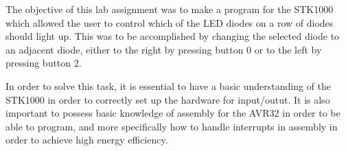 The objective of this lab assignment was to make a program for the STK1000 which allowed the user to control which of the LED diodes on a row of diodes should light up.
This was to be accomplished by changing the selected diode to an adjacent diode, either to the right by pressing button 0 or to the left by pressing button 2.

In order to solve this task, it is essential to have a basic understanding of the STK1000 in order to correctly set up the hardware for input/outut.
It is also important to possess basic knowledge of assembly for the AVR32 in order to be able to program, and more specifically how to handle interrupts in assembly in order to achieve high energy efficiency.
